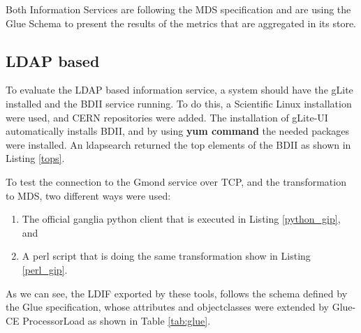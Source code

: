 Both Information Services are following the \ac{MDS} specification and are using the Glue Schema to present the results of the metrics that are aggregated in its store.

\subsection{LDAP based}

To evaluate the LDAP based information service, a system should have the gLite installed and the BDII service running. To do this, a Scientific Linux installation were used, and CERN repositories were added. The installation of gLite-UI automatically installs \ac{BDII}, and by using {\bf yum command} the needed packages were installed. An ldapsearch returned the top elements of the \ac{BDII} as shown in Listing \ref{tops}.

To test the connection to the Gmond service over TCP, and the transformation to \ac{MDS}, two different ways were used:

\begin{enumerate}
\item The official ganglia python client that is executed in Listing \ref{python_gip}, and
\item A perl script that is doing the same transformation show in Listing \ref{perl_gip}.
\end{enumerate}

As we can see, the LDIF exported by these tools, follows the schema defined by the Glue specification, whose attributes and objectclasses were extended by Glue-CE ProcessorLoad as shown in Table \ref{tab:glue}.

